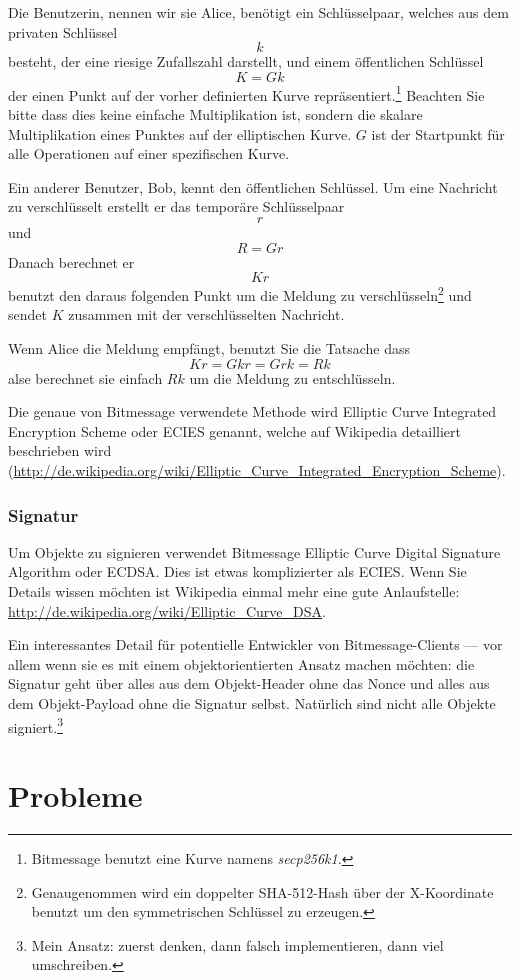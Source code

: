 \documentclass{bfh}
\begin{document}
  Die Benutzerin, nennen wir sie Alice, benötigt ein Schlüsselpaar, welches aus dem privaten Schlüssel
$$k$$
besteht, der eine riesige Zufallszahl darstellt, und einem öffentlichen Schlüssel
$$K = G k$$
der einen Punkt auf der vorher definierten Kurve repräsentiert.\footnote{Bitmessage benutzt eine Kurve namens \textit{secp256k1}.} Beachten Sie bitte dass dies keine einfache Multiplikation ist, sondern die skalare Multiplikation eines Punktes auf der elliptischen Kurve. $G$ ist der Startpunkt für alle Operationen auf einer spezifischen Kurve.

  Ein anderer Benutzer, Bob, kennt den öffentlichen Schlüssel. Um eine Nachricht zu verschlüsselt erstellt er das temporäre Schlüsselpaar
$$r$$
und
$$R = G r$$
Danach berechnet er
$$K r$$
benutzt den daraus folgenden Punkt um die Meldung zu verschlüsseln\footnote{Genaugenommen wird ein doppelter SHA-512-Hash über der X-Koordinate benutzt um den symmetrischen Schlüssel zu erzeugen.} und sendet $K$ zusammen mit der verschlüsselten Nachricht.

  Wenn Alice die Meldung empfängt, benutzt Sie die Tatsache dass
$$K r = G k r = G r k = R k$$
alse berechnet sie einfach $R k$ um die Meldung zu entschlüsseln.

  Die genaue von Bitmessage verwendete Methode wird Elliptic Curve Integrated Encryption Scheme oder ECIES genannt, welche auf Wikipedia detailliert beschrieben wird (\url{http://de.wikipedia.org/wiki/Elliptic_Curve_Integrated_Encryption_Scheme}).

  \subsubsection{Signatur}

  Um Objekte zu signieren verwendet Bitmessage Elliptic Curve Digital Signature Algorithm oder ECDSA. Dies ist etwas komplizierter als ECIES. Wenn Sie Details wissen möchten ist Wikipedia einmal mehr eine gute Anlaufstelle: \url{http://de.wikipedia.org/wiki/Elliptic_Curve_DSA}.

  Ein interessantes Detail für potentielle Entwickler von Bitmessage-Clients --- vor allem wenn sie es mit einem objektorientierten Ansatz machen möchten: die Signatur geht über alles aus dem Objekt-Header ohne das Nonce und alles aus dem Objekt-Payload ohne die Signatur selbst. Natürlich sind nicht alle Objekte signiert.\footnote{Mein Ansatz: zuerst denken, dann falsch implementieren, dann viel umschreiben.}

  \newpage
  \section{Probleme}
\end{document}
